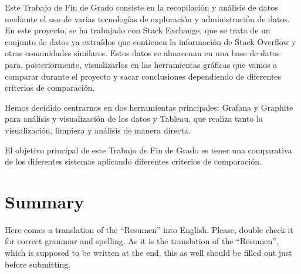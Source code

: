 \documentclass[a4paper, 12pt]{book}
\begin{document}
Este Trabajo de Fin de Grado consiste en la recopilación y análisis de datos mediante el uso de varias tecnologías de exploración y administración de datos. En este proyecto, se ha trabajado con Stack Exchange, que se trata de un conjunto de datos ya extraídos que contienen la información de Stack Overflow y otras comunidades similares. Estos datos se almacenan en una base de datos para, posteriormente, visualizarlos en las herramientas gráficas que vamos a comparar durante el proyecto y sacar conclusiones dependiendo de diferentes criterios de comparación.

Hemos decidido centrarnos en dos herramientas principales: Grafana y Graphite para análisis y visualización de los datos y Tableau, que realiza tanto la visualización, limpieza y análisis de manera directa.

El objetivo principal de este Trabajo de Fin de Grado es tener una comparativa de los diferentes sistemas aplicando diferentes criterios de comparación.




%


\chapter*{Summary}

Here comes a translation of the ``Resumen'' into English. 
Please, double check it for correct grammar and spelling.
As it is the translation of the ``Resumen'', which is supposed to be written at the end, this as well should be filled out just before submitting.
\end{document}

